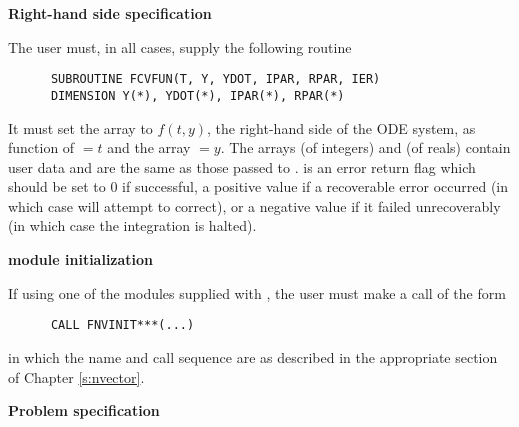 \begin{Steps}
  
\item {\bf Right-hand side specification}
  
  The user must, in all cases, supply the following {\F} routine
\begin{verbatim}
      SUBROUTINE FCVFUN(T, Y, YDOT, IPAR, RPAR, IER)
      DIMENSION Y(*), YDOT(*), IPAR(*), RPAR(*)
\end{verbatim}
  It must set the  array to $f(t,y)$, the right-hand side of the ODE
  system, as function of $=t$ and the array $=y$.  
  The arrays  (of integers) and  (of reals) contain user data
  and are the same as those passed to .
   is an error return flag which should be set to $0$ if successful, a positive
  value if a recoverable error occurred (in which case {\cvode} will attempt to correct), 
  or a negative value if it failed unrecoverably (in which case the integration is 
  halted).

\item  {\bf {\nvector} module initialization}

  If using one of the {\nvector} modules supplied with {\sundials},
  the user must make a call of the form
\begin{verbatim}
      CALL FNVINIT***(...)
\end{verbatim}
in which the name and call sequence are as described in the appropriate
section of Chapter \ref{s:nvector}.

\item {\bf Problem specification}


\end{Steps}
